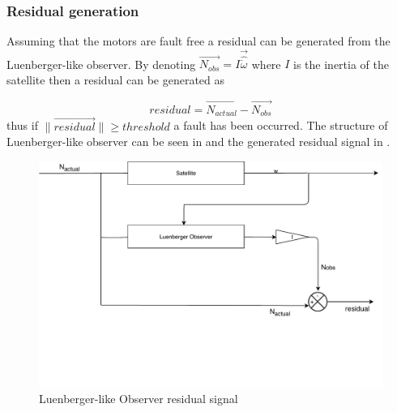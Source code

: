 \subsubsection{Residual generation}
 \label{sec:simpleObserveresidual}
 Assuming that the motors are fault free a residual can be generated from the Luenberger-like observer. By denoting $\vec{N_{obs}} =I\vec{\hat{{\dot \omega}}}$ where $I$ is the inertia of the satellite then a residual can be generated as

 \begin{equation}
 residual = \vec{N_{actual}} - \vec{N_{obs}}
 \label{eq:residualObs}
 \end{equation}
 thus if $\lVert \vec{residual} \rVert \geq threshold$ a fault has been occurred. The structure of Luenberger-like observer can be seen in  and the generated residual signal in  . 

\begin{figure}[H]
	\centering
	\includegraphics[width=0.7\linewidth]{figures/Observer}
	\caption{Luenberger-like Observer residual signal }
	\label{fig:observer2}
\end{figure}

